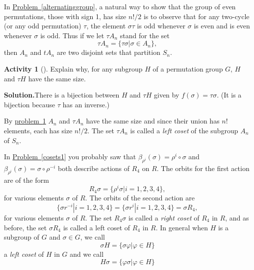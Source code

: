\documentclass[10pt,]{book}
\theoremstyle{plain}
\theoremstyle{definition}
\newtheorem{activity}[project]{Activity}
\numberwithin{equation}{chapter}
\begin{document}
In \hyperref[alternatinggroup]{Problem~\ref{alternatinggroup}}, a natural way to show that the group of even permutations, those with sign 1, has size \(n!/2\) is to observe that for any two-cycle (or any odd permutation) \(\tau\), the element \(\sigma\tau\) is odd whenever \(\sigma\) is even and is even whenever \(\sigma\) is odd. Thus if we let \(\tau
A_n\) stand for the set%
\begin{equation*}
\tau A_n = \{\tau\sigma|\sigma \in A_n\},
\end{equation*}
then \(A_n\) and \(tA_n\) are two disjoint sets that partition \(S_n\).%
\begin{activity}[]\label{cosetsize}
Explain why, for any subgroup \(H\) of a permutation group \(G\), \(H\) and \(\tau H\) have the same size.%
\par\medskip\noindent%
\textbf{Solution.}\quad There is a bijection between \(H\) and \(\tau H\) given by \(f(\sigma)
= \tau \sigma\). (It is a bijection because \(\tau\) has an inverse.)%
\end{activity}
By \hyperref[cosetsize]{problem~\ref{cosetsize}} \(A_n\) and \(\tau A_n\) have the same size and since their union has \(n!\) elements, each has size \(n!/2\). The set \(\tau
A_n\) is called a \emph{left coset} of the subgroup \(A_n\) of \(S_n\).%
\par
In \hyperref[cosets1]{Problem~\ref{cosets1}} you probably saw that \(\beta_{\rho^i}(\sigma) =
\rho^i\circ\sigma\) and \(\beta_{\rho^i}(\sigma) = \sigma\circ\rho^{-i}\) both describe actions of \(R_4\) on \(R\). The orbits for the first action are of the form%
\begin{equation*}
R_4\sigma=\{\rho^i \sigma| i=1,2,3,4\},
\end{equation*}
for various elements \(\sigma\) of \(R\). The orbits of the second action are%
\begin{equation*}
\{\sigma r^{-i}| i=1,2,3,4\} = \{\sigma r^i|i = 1,2,3,4\} = \sigma
R_4,
\end{equation*}
for various elements \(\sigma\) of \(R\). The set \(R_4\sigma\) is called a \emph{right coset} of \(R_4\) in \(R\), and as before, the set \(\sigma
R_4\) is called a left coset of \(R_4\) in \(R\). In general when \(H\) is a subgroup of \(G\) and \(\sigma \in G\), we call%
\begin{equation*}
\sigma H = \{\sigma \varphi|\varphi \in H\}
\end{equation*}
a \emph{left coset} of \(H\) in \(G\) and we call%
\begin{equation*}
H\sigma  = \{\varphi\sigma  |\varphi \in H\}
\end{equation*}
\end{document}
